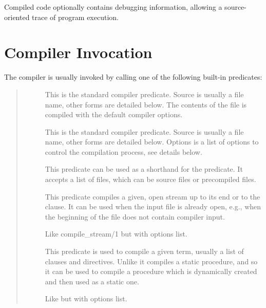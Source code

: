 Compiled code optionally contains debugging information, allowing a
source-oriented trace of program execution.


\section{Compiler Invocation}

The compiler is usually invoked by calling one of the following built-in
predicates:
\begin{quote}
\begin{description}
\item[]
This is the standard compiler predicate.
Source is usually a file name, other forms are detailed below.
The contents of the file is compiled with the default compiler options.

\item[]
This is the standard compiler predicate.
Source is usually a file name, other forms are detailed below.
Options is a list of options to control the compilation process, see details
below.

\item[]
This predicate can be used as a shorthand for the
predicate.
It accepts a list of files, which can be source files or precompiled files.

\item[]
This predicate compiles a given, open stream up to its end
or to the  clause.
It can be used when the input file is already open,
e.g., when the beginning of the file does not contain
compiler input.

\item[]
Like compile_stream/1 but with options list.

\item[]
This predicate is used to compile a given term,
usually a list of clauses and directives.
Unlike  it compiles
a static procedure,
and so it can be used to compile a procedure which is dynamically
created and then used as a static one.

\item[]
Like  but with options list.
\end{description}
\end{quote}

